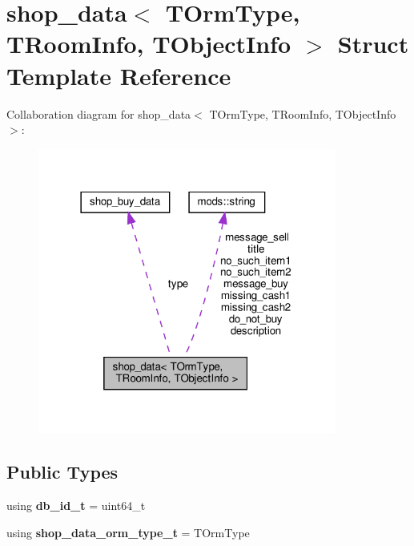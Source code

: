 \hypertarget{structshop__data}{}\section{shop\+\_\+data$<$ T\+Orm\+Type, T\+Room\+Info, T\+Object\+Info $>$ Struct Template Reference}
\label{structshop__data}


Collaboration diagram for shop\+\_\+data$<$ T\+Orm\+Type, T\+Room\+Info, T\+Object\+Info $>$\+:
\nopagebreak
\begin{figure}[H]
\begin{center}
\leavevmode
\includegraphics[width=278pt]{structshop__data__coll__graph}
\end{center}
\end{figure}
\subsection*{Public Types}
\begin{DoxyCompactItemize}
\item 
\mbox{\label{structshop__data_aa8d5ca6548fe7a560e226933db1f7af8}} 
using {\bfseries db\+\_\+id\+\_\+t} = uint64\+\_\+t
\item 
\mbox{\label{structshop__data_a93a07e41ba0d56b6fa9ffa4c39625754}} 
using {\bfseries shop\+\_\+data\+\_\+orm\+\_\+type\+\_\+t} = T\+Orm\+Type
\end{DoxyCompactItemize}
